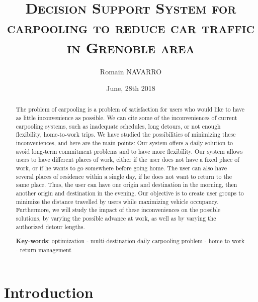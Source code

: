 \documentclass[12pt, a4paper, twoside]{memoir}
\title{\textsc{Decision Support System for carpooling to reduce car traffic in Grenoble area}}%
\author{Romain NAVARRO}
\date{June, 28th 2018}
\newcommand{\newpar}{\vskip 0.2in \noindent}
\begin{document}
	\frontmatter\begin{titlingpage}\maketitle\end{titlingpage}
	\begin{abstract}
		\noindent The problem of carpooling is a problem of satisfaction for users who would like to have as little inconvenience as possible. We can cite some of the inconveniences of current carpooling systems, such as inadequate schedules, long detours, or not enough flexibility, home-to-work trips.
		\newpar
		We have studied the possibilities of minimizing these inconveniences, and here are the main points:\newline 
		Our system offers a daily solution to avoid long-term commitment problems and to have more flexibility.\newline 
		Our system allows users to have different places of work, either if the user does not have a fixed place of work, or if he wants to go somewhere before going home. The user can also have several places of residence within a single day, if he does not want to return to the same place. Thus, the user can have one origin and destination in the morning, then another origin and destination in the evening.
		\newpar
		Our objective is to create user groups to minimize the distance travelled by users while maximizing vehicle occupancy. \newline
		Furthermore, we will study the impact of these inconveniences on the possible solutions, by varying the possible advance at work, as well as by varying the authorized detour lengths.
		\begin{center}
			{\bfseries Key-words}: optimization - multi-destination daily carpooling problem - home to work - return management
		\end{center}
	\end{abstract}

	\cleardoublepage
	\renewcommand{\contentsname}{Table of contents}
	\mainmatter
	\tableofcontents
	
	\cleardoublepage
	\chapter{Introduction}
	
\end{document}
